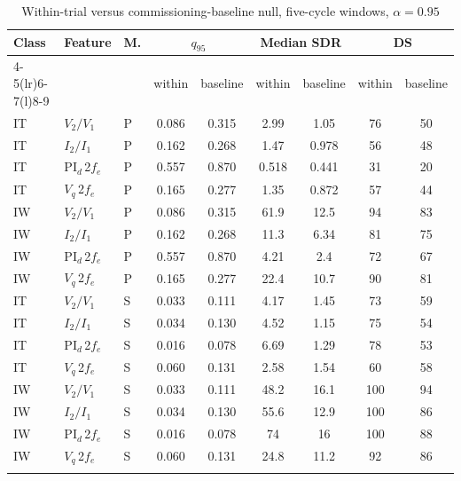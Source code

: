 \begin{table}[t]
\tabsize
\setlength{\tabcolsep}{2.5pt}
\caption{Within-trial versus commissioning-baseline null, five-cycle windows, $\alpha=0.95$}\label{tab:between}
\begin{tabular}{@{}lllcccccc@{}}
\toprule
\multirow{2}{*}{Class} & \multirow{2}{*}{Feature} & \multirow{2}{*}{M.} & \multicolumn{2}{c}{$q_{95}$} & \multicolumn{2}{c}{Median SDR} & \multicolumn{2}{c}{DS} \\
\cmidrule(lr){4-5}\cmidrule(lr){6-7}\cmidrule(l){8-9}
 & & & within & baseline & within & baseline & within & baseline \\
\midrule
IT & $V_2/V_1$ & P & 0.086 & 0.315 & 2.99 & 1.05 & 76 & 50 \\
IT & $I_2/I_1$ & P & 0.162 & 0.268 & 1.47 & 0.978 & 56 & 48 \\
IT & PI$_d$\,2$f_e$ & P & 0.557 & 0.870 & 0.518 & 0.441 & 31 & 20 \\
IT & $V_q$\,2$f_e$ & P & 0.165 & 0.277 & 1.35 & 0.872 & 57 & 44 \\
IW & $V_2/V_1$ & P & 0.086 & 0.315 & 61.9 & 12.5 & 94 & 83 \\
IW & $I_2/I_1$ & P & 0.162 & 0.268 & 11.3 & 6.34 & 81 & 75 \\
IW & PI$_d$\,2$f_e$ & P & 0.557 & 0.870 & 4.21 & 2.4 & 72 & 67 \\
IW & $V_q$\,2$f_e$ & P & 0.165 & 0.277 & 22.4 & 10.7 & 90 & 81 \\
IT & $V_2/V_1$ & S & 0.033 & 0.111 & 4.17 & 1.45 & 73 & 59 \\
IT & $I_2/I_1$ & S & 0.034 & 0.130 & 4.52 & 1.15 & 75 & 54 \\
IT & PI$_d$\,2$f_e$ & S & 0.016 & 0.078 & 6.69 & 1.29 & 78 & 53 \\
IT & $V_q$\,2$f_e$ & S & 0.060 & 0.131 & 2.58 & 1.54 & 60 & 58 \\
IW & $V_2/V_1$ & S & 0.033 & 0.111 & 48.2 & 16.1 & 100 & 94 \\
IW & $I_2/I_1$ & S & 0.034 & 0.130 & 55.6 & 12.9 & 100 & 86 \\
IW & PI$_d$\,2$f_e$ & S & 0.016 & 0.078 & 74 & 16 & 100 & 88 \\
IW & $V_q$\,2$f_e$ & S & 0.060 & 0.131 & 24.8 & 11.2 & 92 & 86 \\
\botrule
\end{tabular}
\end{table}
